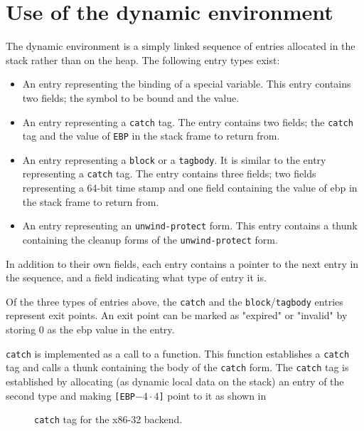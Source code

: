 \section{Use of the dynamic environment}

The dynamic environment is a simply linked sequence of entries
allocated in the stack rather than on the heap.  The following entry
types exist:

\begin{itemize}
  \item An entry representing the binding of a special variable.  This
    entry contains two fields; the symbol to be bound and the value.

  \item An entry representing a \texttt{catch} tag.  The entry
    contains two fields; the \texttt{catch} tag and the value of
    \texttt{EBP} in the stack frame to return from.

  \item An entry representing a \texttt{block} or a \texttt{tagbody}.
    It is similar to the entry representing a \texttt{catch} tag.  The
    entry contains three fields; two fields representing a 64-bit time
    stamp and one field containing the value of ebp in the stack frame
    to return from.

  \item An entry representing an \texttt{unwind-protect} form.  This
    entry contains a thunk containing the cleanup forms of the
    \texttt{unwind-protect} form.
\end{itemize}

In addition to their own fields, each entry contains a pointer to the
next entry in the sequence, and a field indicating what type of entry
it is.

Of the three types of entries above, the \texttt{catch} and the
\texttt{block}/\texttt{tagbody} entries represent exit points.  An
exit point can be marked as "expired" or "invalid" by storing 0 as the
ebp value in the entry.

\texttt{catch} is implemented as a call to a function.  This function
establishes a \texttt{catch} tag and calls a thunk containing the body
of the \texttt{catch} form.  The \texttt{catch} tag is established by
allocating (as dynamic local data on the stack) an entry of the second
type and making \texttt{[EBP$-4 \cdot 4$]} point to it as shown in

\begin{figure}
\begin{center}
\end{center}
\caption{\label{fig-x86-32-catch}
\texttt{catch} tag for the x86-32 backend.}
\end{figure}

